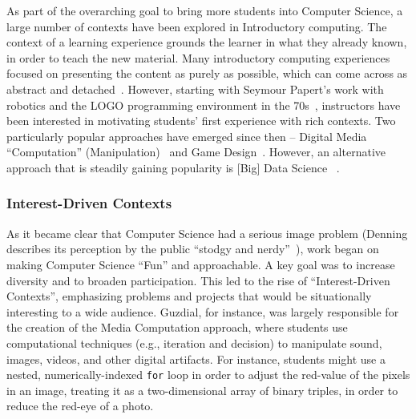 As part of the overarching goal to bring more students into Computer Science, a large number of contexts have been explored in Introductory computing. 
The context of a learning experience grounds the learner in what they already known, in order to teach the new material.
Many introductory computing experiences focused on presenting the content as purely as possible, which can come across as abstract and detached~\cite{Zografski}.
However, starting with Seymour Papert's work with robotics and the LOGO programming environment in the 70s~\cite{papert1996}, instructors have been interested in motivating students' first experience with rich contexts.
Two particularly popular approaches have emerged since then -- Digital Media ``Computation'' (Manipulation)~\cite{Forte} and Game Design~\cite{Zografski}.
However, an alternative approach that is steadily gaining popularity is [Big] Data Science ~\cite{Anderson}.



\subsubsection{Interest-Driven Contexts}

As it became clear that Computer Science had a serious image problem (Denning describes its perception by the public ``stodgy and nerdy''~\cite{Denning:2005}), work began on making Computer Science ``Fun'' and approachable. 
A key goal was to increase diversity and to broaden participation. 
This led to the rise of ``Interest-Driven Contexts'', emphasizing problems and projects that would be situationally interesting to a wide audience.
Guzdial, for instance, was largely responsible for the creation of the Media Computation approach, where students use computational techniques (e.g., iteration and decision) to manipulate sound, images, videos, and other digital artifacts.
For instance, students might use a nested, numerically-indexed \texttt{for} loop in order to adjust the red-value of the pixels in an image, treating it as a two-dimensional array of binary triples, in order to reduce the red-eye of a photo.


